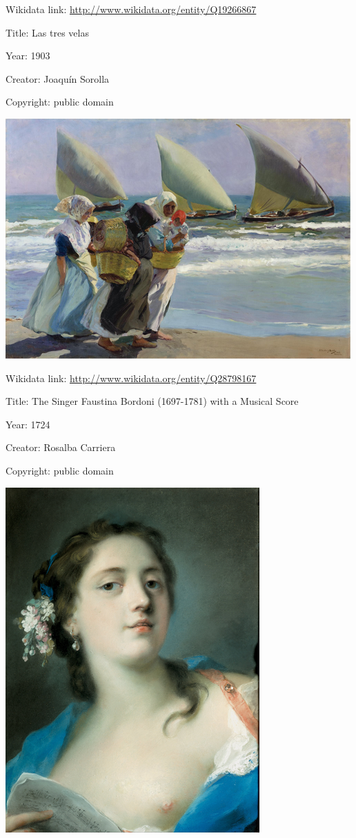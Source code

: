 \documentclass[
  letterpaper,
]{book}
\begin{document}
Wikidata link: \url{http://www.wikidata.org/entity/Q19266867}

Title: Las tres velas

Year: 1903

Creator: Joaquín Sorolla

Copyright: public domain

\includegraphics{paintings_files/figure-pdf/cell-2-output-8.png}

Wikidata link: \url{http://www.wikidata.org/entity/Q28798167}

Title: The Singer Faustina Bordoni (1697-1781) with a Musical Score

Year: 1724

Creator: Rosalba Carriera

Copyright: public domain

\includegraphics{paintings_files/figure-pdf/cell-2-output-10.png}
\end{document}
